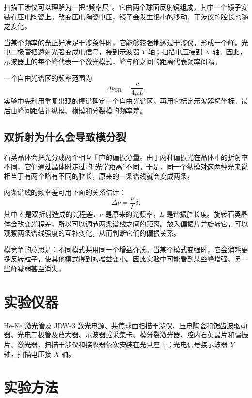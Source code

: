 \documentclass[UTF8,a4paper,10pt]{ctexart}
\begin{document}
扫描干涉仪可以理解为一把“频率尺”。它由两个球面反射镜组成，其中一个镜子安装在压电陶瓷上。改变压电陶瓷电压，镜子会发生很小的移动，干涉仪的腔长也随之变化。

当某个频率的光正好满足干涉条件时，它能够较强地透过干涉仪，形成一个峰。光电二极管把透射光强变成电信号，接到示波器 $Y$ 轴；扫描电压接到 $X$ 轴。因此，示波器上的每个峰代表一个激光模式，峰与峰之间的距离代表频率间隔。

一个自由光谱区的频率范围为
\begin{equation}
  \Delta\nu_{\mathrm{SR}}=\frac{c}{4\mu L}.
  \label{eq:fsr}
\end{equation}
实验中先利用重复出现的模谱确定一个自由光谱区，再用它标定示波器横坐标，最后由峰间距估计纵模、横模和分裂模的频率差。

\subsection{双折射为什么会导致模分裂}

石英晶体会把光分成两个相互垂直的偏振分量。由于两种偏振光在晶体中的折射率不同，它们通过晶体时走过的“光学距离”不同。于是，同一个纵模对这两种光来说相当于有两个略有不同的腔长，原来的一条谱线就会变成两条。

两条谱线的频率差可用下面的关系估计：
\begin{equation}
  \Delta\nu=\frac{\nu}{L}\delta.
  \label{eq:splitting}
\end{equation}
其中 $\delta$ 是双折射造成的光程差，$\nu$ 是原来的光频率，$L$ 是谐振腔长度。旋转石英晶体会改变光程差，所以可以调节两条谱线之间的距离。放入偏振片并旋转它，可以观察两条谱线强度的互补变化，从而判断它们的偏振关系。

模竞争的意思是：不同模式共用同一个增益介质。当某个模式变强时，它会消耗更多反转粒子，使其他模式得到的增益变小。因此实验中可能看到某些峰增强、另一些峰减弱甚至消失。

\section{实验仪器}

He-Ne 激光管及 JDW-3 激光电源、共焦球面扫描干涉仪、压电陶瓷和锯齿波驱动器、光电二极管及放大器、示波器或采集卡、模分裂激光器、腔内石英晶片和偏振片。激光器、扫描干涉仪和接收器依次安装在光具座上；光电信号接示波器 $Y$ 轴，扫描电压接 $X$ 轴。

\section{实验方法}
\end{document}
